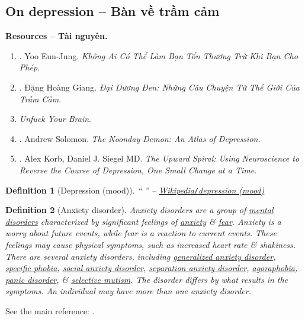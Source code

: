 \documentclass[12pt]{article}
\newtheorem{definition}{Definition}[section]
\begin{document}

\subsection{On depression -- Bàn về trầm cảm}
\textbf{\textsf{Resources -- Tài nguyên.}}
\begin{enumerate}
	\item \cite{Eun-Jung_hurt_VN}. {\sc Yoo Eun-Jung}. {\it Không Ai Có Thể Làm Bạn Tổn Thương Trừ Khi Bạn Cho Phép}.
	\item \cite{Giang_dai_duong_den}. {\sc Đặng Hoàng Giang}. {\it Đại Dương Đen: Những Câu Chuyện Từ Thế Giới Của Trầm Cảm}.
	\item {\it Unfuck Your Brain}.
	\item \cite{Solomon_depression}. {\sc Andrew Solomon}. {\it The Noonday Demon: An Atlas of Depression}.
	\item \cite{Korb_Siegel_upward_spiral}. {\sc Alex Korb, Daniel J. Siegel MD}. {\it The Upward Spiral: Using Neuroscience to Reverse the Course of Depression, One Small Change at a Time}.
\end{enumerate}

\begin{definition}[Depression (mood)]
	`` '' -- \href{https://en.wikipedia.org/wiki/Depression_(mood)}{Wikipedia{\tt/}depression (mood)}
\end{definition}

\begin{definition}[Anxiety disorder]
	\emph{Anxiety disorders} are a group of \href{https://en.wikipedia.org/wiki/Mental_disorder}{mental disorders} characterized by significant feelings of \href{https://en.wikipedia.org/wiki/Anxiety_(mood)}{anxiety} \& \href{https://en.wikipedia.org/wiki/Fear}{fear}. Anxiety is a worry about future events, while fear is a reaction to current events. These feelings may cause physical symptoms, such as increased heart rate \& shakiness. There are several anxiety disorders, including \href{https://en.wikipedia.org/wiki/Generalized_anxiety_disorder}{generalized anxiety disorder}, \href{https://en.wikipedia.org/wiki/Specific_phobia}{specific phobia}, \href{https://en.wikipedia.org/wiki/Social_anxiety_disorder}{social anxiety disorder}, \href{https://en.wikipedia.org/wiki/Separation_anxiety_disorder}{separation anxiety disorder}, \href{https://en.wikipedia.org/wiki/Agoraphobia}{agoraphobia}, \href{https://en.wikipedia.org/wiki/Panic_disorder}{panic disorder}, \& \href{https://en.wikipedia.org/wiki/Selective_mutism}{selective mutism}. The disorder differs by what results in the symptoms. An individual may have more than one anxiety disorder.
\end{definition}
See the main reference: \cite{APA2013}.
\end{document}
